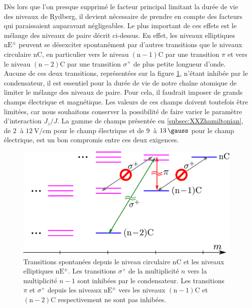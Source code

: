 \noindent Dès lors que l'on presque supprimé le facteur principal limitant la durée de vie des niveaux de Rydberg, il devient nécessaire de prendre en compte des facteurs qui paraissaient auparavant négligeables.
Le plus important de ces effets est le mélange des niveaux de paire décrit ci-dessus.
En effet, les niveaux elliptiques $\mathrm{nE^{\pm}}$ peuvent se désexciter spontanément par d'autres transitions que le niveaux circulaire $\mathrm{nC}$, en particulier vers le niveau $\mathrm{(n-1)C}$ par une transition $\pi$ et vers le niveau $\mathrm{(n-2)C}$ par une transition $\sigma^+$ de plus petite longueur d'onde.
Aucune de ces deux transitions, représentées sur la figure \ref{fig:sigma_pi}, n'étant inhibée par le condensateur, il est essentiel pour la durée de vie de notre chaîne atomique de limiter le mélange des niveaux de paire.
Pour cela, il faudrait imposer de grands champs électrique et magnétique.
Les valeurs de ces champs doivent toutefois être limitées, car nous souhaitons conserver la possibilité de faire varier le paramètre d'interaction $J_z/J$.
La gamme de champs présentée en \ref{subsec:XXZhamiltonian}, de $\SI{2}{}$ à $\SI{12}{\V/\cm}$ pour le champ électrique et de $\SI{9}{}$ à $\SI{13}{\gauss}$ pour le champ électrique, est un bon compromis entre ces deux exigences.
\begin{figure}[h]
\centering
\includegraphics[width=0.7 \linewidth]{figures/circsim/sigma_pi}
\caption[Transitions spontanées depuis les niveaux elliptiques $\mathrm{nE^\pm}$]{
Transitions spontanées depuis le niveau circulaire $\mathrm{nC}$ et les niveaux elliptiques $\mathrm{nE^\pm}$.
Les transitions $\sigma^+$ de la multiplicité $n$ vers la multiplicité $n-1$ sont inhibées par le condensateur.
Les transitions $\pi$ et $\sigma^+$ depuis les niveaux $\mathrm{nE^\pm}$ vers les niveaux $\mathrm{(n-1)C}$ et $\mathrm{(n-2)C}$ respectivement ne sont pas inhibées.
}
\label{fig:sigma_pi}
\end{figure}


